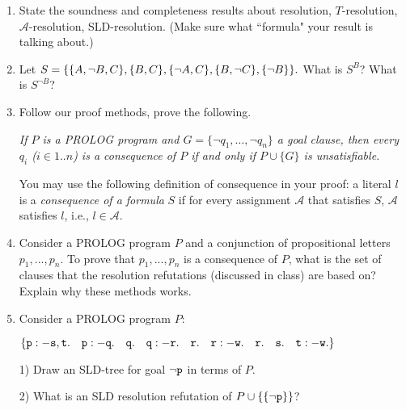 \documentclass[12pt, letterpaper]{article}
\begin{document}
\begin{enumerate}

\item State the soundness and completeness results about 
resolution, $T$-resolution, $\mathcal{A}$-resolution, SLD-resolution. 
(Make sure what ``formula" your result is talking about.)


\item Let $S = \{\{A, \neg B, C\}, \{B, C\}, \{\neg A, C\}, \{B, \neg
C\}, \{\neg B\}\}.$ What is $S^{B}$? What is $S^{\neg B}$?  

\item Follow our proof methods, prove the following. 

{\em If $P$ is a PROLOG program and $G = \{\neg q_1, \ldots, \neg q_n\}$ a goal clause, then every $q_i$ ($i \in 1..n$) is a consequence 
of $P$ if and only if $P \cup \{G\}$ is unsatisfiable.}

You may use the following definition of consequence in your proof: 
a literal $l$ is a {\em consequence of a formula} $S$ if for every 
assignment $\mathcal{A}$ that satisfies $S$,  $\mathcal{A}$ satisfies $l$, i.e., $l \in \mathcal{A}$. 




\item Consider a PROLOG program $P$ and a conjunction of propositional letters $p_1, ..., p_n$. To prove that
$p_1, ..., p_n$ is a consequence of $P$, what is the set of clauses that the resolution refutations (discussed in class) are based on?  Explain why these  methods works. 

\item Consider a PROLOG program $P$: 

$\{{\tt p :- s, t. ~~~ p :- q. ~~~ q. ~~~ q :- r. ~~~ r. ~~~ r :- w. ~~~ r. ~~~s. ~~~ t :- w.}\}$

1) Draw an SLD-tree for goal ${\tt \neg p}$ in terms of $P$. 

2) What is an SLD resolution refutation of $P \cup \{\{{\tt \neg
p}\}\}$? 
\end{enumerate}
\end{document}
